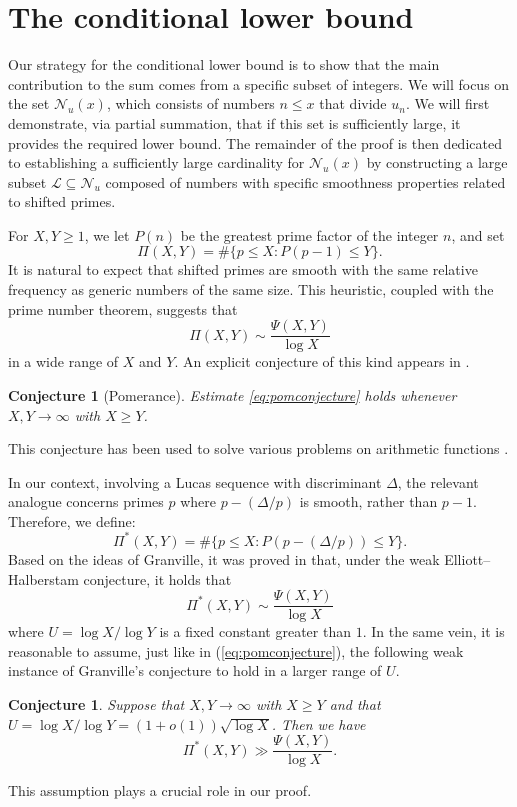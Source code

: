 \documentclass[12pt,a4paper,oneside]{amsart}
\newtheorem{conjecture}[theorem]{Conjecture}
\begin{document}
\section{The conditional lower bound}
Our strategy for the conditional lower bound is to show that the main contribution to the sum comes from a specific subset of integers. We will focus on the set $\mathcal{N}_{u}(x)$, which consists of numbers $n \leq x$ that divide $u_n$. We will first demonstrate, via partial summation, that if this set is sufficiently large, it provides the required lower bound. The remainder of the proof is then dedicated to establishing a sufficiently large cardinality for $\mathcal{N}_{u}(x)$ by constructing a large subset $\mathcal{L} \subseteq \mathcal{N}_{u}$ composed of numbers with specific smoothness properties related to shifted primes.

For $X, Y \ge 1$, we let $P(n)$ be the greatest prime factor of the integer $n$, and set
\[ \Pi(X, Y) = \#\{p\le X: P(p-1) \le Y\}. \]
It is natural to expect that shifted primes are smooth with the same relative frequency as generic numbers of the same size. This heuristic, coupled with the prime number theorem, suggests that
\begin{equation}\label{eq:pomconjecture} \Pi(X,Y) \sim \frac{\Psi(X,Y)}{\log{X}} \end{equation}
in a wide range of $X$ and $Y$\!. An explicit conjecture of this kind appears in \cite{Po80}.

\begin{conjecture}[Pomerance]\label{pomconj}
Estimate \eqref{eq:pomconjecture} holds whenever $X,Y\to\infty$ with $X\ge Y$.
\end{conjecture}
This conjecture has been used to solve various problems on arithmetic functions \cite{Po19}. 

\medskip

In our context, involving a Lucas sequence with discriminant $\Delta$, the relevant analogue concerns primes $p$ where $p-(\Delta/p)$ is smooth, rather than $p-1$. Therefore, we define:
\[\Pi^{*}(X, Y) = \#\{p\le X: P(p-(\Delta/p)) \le Y\}. \] Based on the ideas of Granville, it was proved in \cite[Lemma 6.2.1]{Ag22} that, under the weak Elliott--Halberstam conjecture, it holds that
\[ \Pi^{*}(X,Y) \sim \frac{\Psi(X,Y)}{\log{X}} \] where $U=\log X/\log Y$ is a fixed constant greater than $1$. In the same vein, it is reasonable to assume, just like in (\ref{eq:pomconjecture}), the following weak instance of Granville's conjecture to hold in a larger range of $U$.
\begin{conjecture}\label{shiftedconj} 
Suppose that $X,Y\to\infty$ with $X\ge Y$ and that $U=\log X/\log Y  =(1+o(1))\sqrt{\log X}$. Then we have
\begin{equation}\label{eq:komconjecture} \Pi^{*}(X,Y) \gg \frac{\Psi(X,Y)}{\log{X}}. \end{equation}
\end{conjecture}
\noindent This assumption plays a crucial role in our proof.
\end{document}
